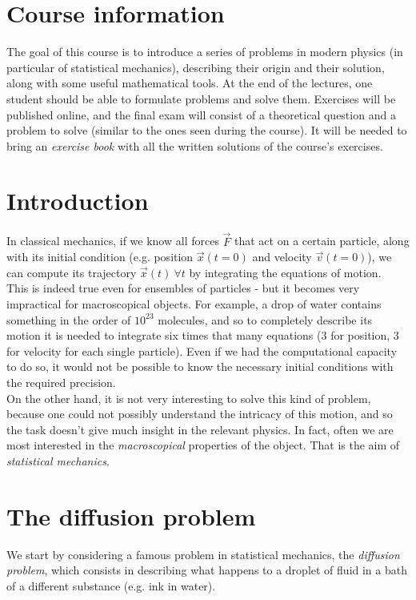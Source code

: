 \documentclass[../template.tex]{subfiles}
\begin{document}
\section{Course information} %
The goal of this course is to introduce a series of problems in modern physics (in particular of statistical mechanics), describing their origin and their solution, along with some useful mathematical tools. At the end of the lectures, one student should be able to formulate problems and solve them. Exercises will be published online, and the final exam will consist of a theoretical question and a problem to solve (similar to the ones seen during the course). It will be needed to bring an \textit{exercise book} with all the written solutions of the course's exercises.\\


\section{Introduction}
In classical mechanics, if we know all forces $\vec{F}$ that act on a certain particle, along with its initial condition (e.g. position $\vec{x}(t=0)$ and velocity $\vec{v}(t=0)$), we can compute its trajectory $\vec{x}(t)\> \forall t$ by integrating the equations of motion.\\
This is indeed true even for ensembles of particles - but it becomes very impractical for macroscopical objects. For example, a drop of water contains something in the order of $10^{23}$ molecules, and so to completely describe its motion it is needed to integrate six times that many equations ($3$ for position, $3$ for velocity for each single particle). Even if we had the computational capacity to do so, it would not be possible to know the necessary initial conditions with the required precision.\\

On the other hand, it is not very interesting to solve this kind of problem, because one could not possibly understand the intricacy of this motion, and so the task doesn't give much insight in the relevant physics. In fact, often we are most interested in the \textit{macroscopical} properties of the object. That is the aim of \textit{statistical mechanics}.

\section{The diffusion problem}
We start by considering a famous problem in statistical mechanics, the \textit{diffusion problem}, which consists in describing what happens to a droplet of fluid in a bath of a different substance (e.g. ink in water).\\
\end{document}

